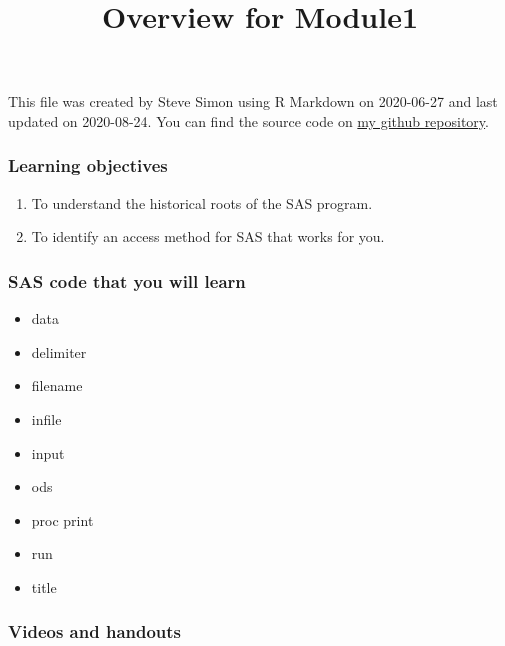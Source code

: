 \documentclass[
]{article}
\title{Overview for Module1}
\author{}
\date{\vspace{-2.5em}}
\providecommand{\tightlist}{%
  \setlength{\itemsep}{0pt}\setlength{\parskip}{0pt}}
\begin{document}
\maketitle

This file was created by Steve Simon using R Markdown on 2020-06-27 and
last updated on 2020-08-24. You can find the source code on
\href{https://github.com/pmean/introduction-to-SAS/tree/master/basics1/src/overview1.Rmd}{my
github repository}.

\hypertarget{learning-objectives}{%
\subsubsection{Learning objectives}\label{learning-objectives}}

\begin{enumerate}
\def\labelenumi{\arabic{enumi}.}
\item
  To understand the historical roots of the SAS program.
\item
  To identify an access method for SAS that works for you.
\end{enumerate}

\hypertarget{sas-code-that-you-will-learn}{%
\subsubsection{SAS code that you will
learn}\label{sas-code-that-you-will-learn}}

\begin{itemize}
\tightlist
\item
  data
\item
  delimiter
\item
  filename
\item
  infile
\item
  input
\item
  ods
\item
  proc print
\item
  run
\item
  title
\end{itemize}

\hypertarget{videos-and-handouts}{%
\subsubsection{Videos and handouts}\label{videos-and-handouts}}
\end{document}
